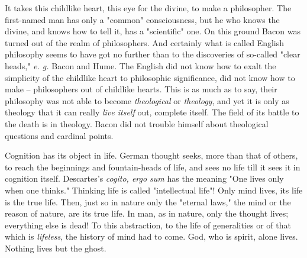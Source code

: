 \documentclass[a4paper]{book}
\begin{document}
\noindent{}It takes this childlike heart, this eye for the divine, to make a 
philosopher. The first-named man has only a "{}common"{} consciousness, but he 
who knows the divine, and knows how to tell it, has a "{}scientific"{} one. On 
this ground Bacon was turned out of the realm of philosophers. And certainly 
what is called English philosophy seems to have got no further than to the 
discoveries of so-called "{}clear heads,"{} \textit{e. g.} Bacon and Hume. The 
English did not know how to exalt the simplicity of the childlike heart to 
philosophic significance, did not know how to make -- philosophers out of 
childlike hearts. This is as much as to say, their philosophy was not able to 
become \textit{theological} or \textit{theology}, and yet it is only as 
theology that it can really \textit{live itself} out, complete itself. The 
field of its battle to the death is in theology. Bacon did not trouble himself 
about theological questions and cardinal points.

Cognition has its object in life. German thought seeks, more than that of 
others, to reach the beginnings and fountain-heads of life, and sees no life 
till it sees it in cognition itself. Descartes's \textit{cogito, ergo sum} has 
the meaning "{}One lives only when one thinks."{} Thinking life is called 
"{}intellectual life"{}! Only mind lives, its life is the true life. Then, 
just so in nature only the "{}eternal laws,"{} the mind or the reason of 
nature, are its true life. In man, as in nature, only the thought lives; 
everything else is dead! To this abstraction, to the life of generalities or 
of that which is \textit{lifeless}, the history of mind had to come. God, who 
is spirit, alone lives. Nothing lives but the ghost.
\end{document}
